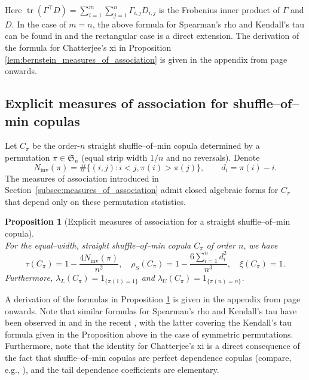 \documentclass{article}
\newtheorem{proposition}[thm]{Proposition}
\theoremstyle{definition}
\DeclareMathOperator{\tr}{tr}  %
\begin{document}
Here $\tr(\Gamma^\top D)=\sum_{i=1}^m\sum_{j=1}^n \Gamma_{i,j}D_{i,j}$ is the Frobenius inner product of $\Gamma$ and $D$.
In the case of $m=n$, the above formula for Spearman's rho and Kendall's tau can be found in \cite[Theorem 9 and 10]{durrleman2000copulas} and the rectangular case is a direct extension.
The derivation of the formula for Chatterjee's xi in Proposition \ref{lem:bernstein_measures_of_association} is given in the appendix from page \pageref{proof:bernstein_measures_of_association} onwards.

\subsection{Explicit measures of association for shuffle--of--min copulas}
\label{subsec:shuffle_of_min_measures}

Let $C_\pi$ be the order-$n$ straight shuffle--of--min copula determined by a permutation $\pi\in\mathfrak{S}_n$ (equal strip width $1/n$ and no reversals). Denote
\[
    N_{\mathrm{inv}}(\pi)=\#\{(i,j):i<j,\pi(i)>\pi(j)\},
\qquad
    d_i=\pi(i)-i.
\]
The measures of association introduced in Section~\ref{subsec:measures_of_association} admit closed algebraic forms for $C_{\pi}$ that depend only on these permutation statistics.

\begin{proposition}[Explicit measures of association for a straight shuffle--of--min copula]\label{prop:shuffle_measures}~\\
For the equal--width, straight shuffle--of--min copula $C_\pi$ of order $n$, we have
\[
    \tau(C_\pi) = 1-\frac{4N_{\mathrm{inv}}(\pi)}{n^2},
    \quad
    \rho_S(C_\pi) = 1-\frac{6\sum_{i=1}^n d_i^2}{n^3},
    \quad
    \xi(C_\pi) = 1.
\]
Furthermore, $\lambda_L(C_\pi) = 1_{\{\pi(1)=1\}}$ and $\lambda_U(C_\pi) = 1_{\{\pi(n)=n\}}$.
\end{proposition}

A derivation of the formulas in Proposition \ref{prop:shuffle_measures} is given in the appendix from page \pageref{proof:shuffle_measures} onwards.
Note that similar formulas for Spearman's rho and Kendall's tau have been observed in \cite[Lemma 1]{schreyer2017exact} and in the recent \cite[Lemma 3.2]{tschimpke2025revisiting}, with the latter covering the Kendall's tau formula given in the Proposition above in the case of symmetric permutations.
Furthermore, note that the identity for Chatterjee's xi is a direct consequence of the fact that shuffle--of--min copulas are perfect dependence copulas (compare, e.g., \cite[Example 1.1]{ansari2025continuity}), and the tail dependence coefficients are elementary.
\end{document}
